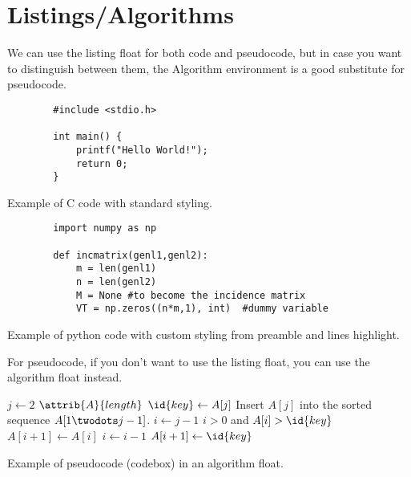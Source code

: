 \section{Listings/Algorithms}
We can use the listing float for both code and pseudocode, but in case you want to distinguish between them, the Algorithm environment is a good substitute for pseudocode.

\begin{listing}[htb!]
    \begin{verbatim}
        #include <stdio.h>

        int main() {
            printf("Hello World!");
            return 0;
        }
    \end{verbatim}
    \caption{Example of C code with standard styling.}
    \label{lst:example-listing-1}
\end{listing}

\begin{listing}[htb!]
    \begin{verbatim}
        import numpy as np

        def incmatrix(genl1,genl2):
            m = len(genl1)
            n = len(genl2)
            M = None #to become the incidence matrix
            VT = np.zeros((n*m,1), int)  #dummy variable
    \end{verbatim}
    \caption{Example of python code with custom styling from preamble and lines highlight.}
    \label{lst:example-listing-2}
\end{listing}

For pseudocode, if you don't want to use the listing float, you can use the algorithm float instead.

\begin{algorithm}
    \begin{codebox}
        \li \For $j \gets 2$ \To $\attrib{A}{length}$
        \label{li:ins-sort-for}
        \li \Do
        $\id{key} \gets A[j]$ \label{li:ins-sort-pick}
        \label{li:ins-sort-for-body-begin}
        \li \Comment Insert $A[j]$ into the sorted sequence
        $A[1 \twodots j-1]$.
        \li $i \gets j-1$ \label{li:ins-sort-find-begin}
        \li \While $i > 0$ and $A[i] > \id{key}$
        \label{li:ins-sort-while}
        \li \Do
        $A[i+1] \gets A[i]$ \label{li:ins-sort-while-begin}
        \li $i \gets i-1$ \label{li:ins-sort-find-end}
        \label{li:ins-sort-while-end}
        \End
        \li $A[i+1] \gets \id{key}$ \label{li:ins-sort-ins}
        \label{li:ins-sort-for-body-end}
        \End
    \end{codebox}
    \caption{Example of pseudocode (codebox) in an algorithm float.}
    \label{alg:example-algorithm-1}
\end{algorithm}


